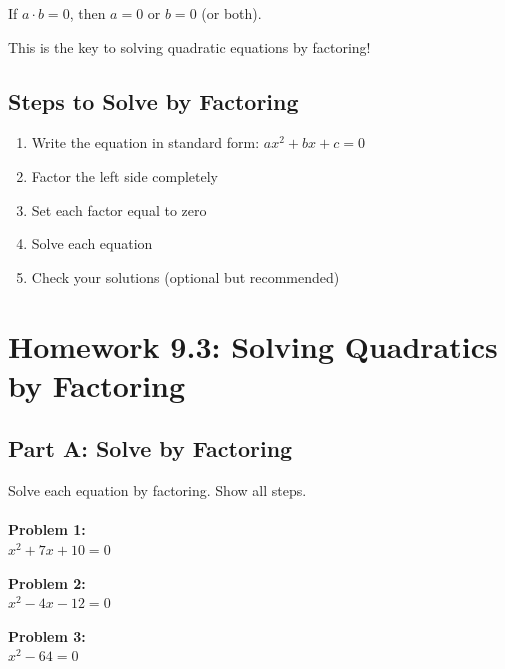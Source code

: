 \documentclass[12pt]{article}
\begin{document}
			If $a \cdot b = 0$, then $a = 0$ or $b = 0$ (or both).

			This is the key to solving quadratic equations by factoring!

		\subsection*{Steps to Solve by Factoring}

			\begin{enumerate}
				\item Write the equation in standard form: $ax^2 + bx + c = 0$
				\item Factor the left side completely
				\item Set each factor equal to zero
				\item Solve each equation
				\item Check your solutions (optional but recommended)
			\end{enumerate}

			\newpage

	\section*{Homework 9.3: Solving Quadratics by Factoring}

		\subsection*{Part A: Solve by Factoring}

			Solve each equation by factoring. Show all steps.\\\\

			\textbf{Problem 1:}\\
            
            $x^2 + 7x + 10 = 0$

			\vspace{3cm}

			\textbf{Problem 2:}\\
            
            $x^2 - 4x - 12 = 0$

			\vspace{3cm}

			\textbf{Problem 3:}\\
            
            $x^2 - 64 = 0$

			\vspace{3cm}
\end{document}

